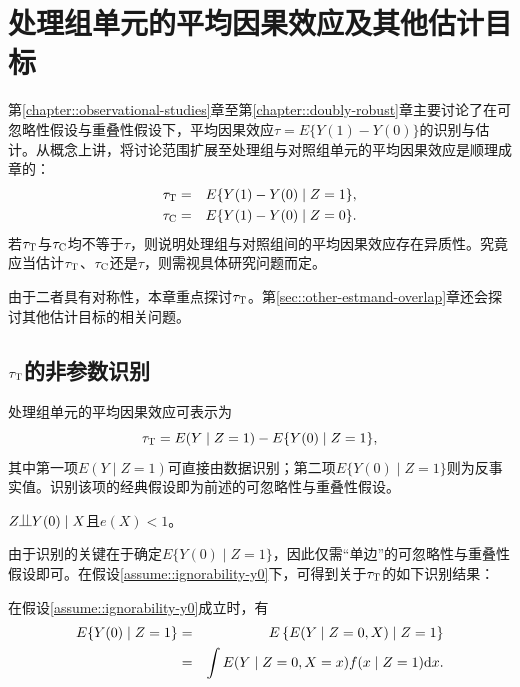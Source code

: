 
\chapter{处理组单元的平均因果效应及其他估计目标}
 \label{chapter::ATT-and-other}

第\ref{chapter::observational-studies}章至第\ref{chapter::doubly-robust}章主要讨论了在可忽略性假设与重叠性假设下，平均因果效应$\tau = E\{  Y(1) - Y(0) \}$的识别与估计。从概念上讲，将讨论范围扩展至处理组与对照组单元的平均因果效应是顺理成章的：
\begin{eqnarray*}
\tau_\textsc{T}  &=&  E\{  Y(1) - Y(0) \mid Z=1 \} ,  \\
\tau_\textsc{C}  &=&  E\{  Y(1) - Y(0) \mid Z=0 \} . 
\end{eqnarray*}
若$\tau_\textsc{T}$与$\tau_\textsc{C}$均不等于$\tau$，则说明处理组与对照组间的平均因果效应存在异质性。究竟应当估计$\tau_\textsc{T}$、$\tau_\textsc{C}$还是$\tau$，则需视具体研究问题而定。 


由于二者具有对称性，本章重点探讨$\tau_\textsc{T} $。第\ref{sec::other-estmand-overlap}章还会探讨其他估计目标的相关问题。



\section{$\tau_\textsc{T} $的非参数识别}


处理组单元的平均因果效应可表示为
$$
\tau_\textsc{T} = E(Y\mid Z=1) -  E\{    Y(0) \mid Z=1 \},
$$
其中第一项$E(Y\mid Z=1) $可直接由数据识别；第二项$E\{    Y(0) \mid Z=1 \}$则为反事实值。识别该项的经典假设即为前述的可忽略性与重叠性假设。



\begin{assumption}
\label{assume::ignorability-y0}
$Z\ind Y(0) \mid X$且$e(X) < 1$。 
\end{assumption}

由于识别的关键在于确定$E\{    Y(0) \mid Z=1 \}$，因此仅需“单边”的可忽略性与重叠性假设即可。在假设\ref{assume::ignorability-y0}下，可得到关于$\tau_\textsc{T} $的如下识别结果： 


\begin{theorem}
\label{thm::identification-ATT}
在假设\ref{assume::ignorability-y0}成立时，有
\begin{eqnarray*}
 E\{    Y(0) \mid Z=1 \}  &=& E\left\{  E(    Y \mid Z=0 , X) \mid  Z=1  \right\} \\
 &=&  \int  E(    Y \mid Z=0 , X=x) f(  x \mid Z=1) \textup{d} x .
\end{eqnarray*}
\end{theorem}


